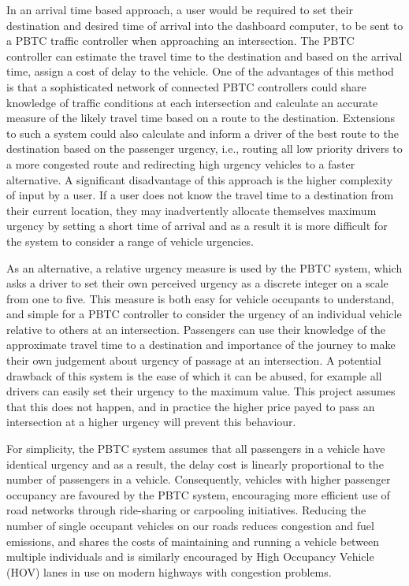 In an arrival time based approach, a user would be required to set their destination and desired time of arrival into the dashboard computer, to be sent to a PBTC traffic controller when approaching an intersection. The PBTC controller can estimate the travel time to the destination and based on the arrival time, assign a cost of delay to the vehicle. One of the advantages of this method is that a sophisticated network of connected PBTC controllers could share knowledge of traffic conditions at each intersection and calculate an accurate measure of the likely travel time based on a route to the destination. Extensions to such a system could also calculate and inform a driver of the best route to the destination based on the passenger urgency, i.e., routing all low priority drivers to a more congested route and redirecting high urgency vehicles to a faster alternative. A significant disadvantage of this approach is the higher complexity of input by a user. If a user does not know the travel time to a destination from their current location, they may inadvertently allocate themselves maximum urgency by setting a short time of arrival and as a result it is more difficult for the system to consider a range of vehicle urgencies.

As an alternative, a relative urgency measure is used by the PBTC system, which asks a driver to set their own perceived urgency as a discrete integer on a scale from one to five. This measure is both easy for vehicle occupants to understand, and simple for a PBTC controller to consider the urgency of an individual vehicle relative to others at an intersection. Passengers can use their knowledge of the approximate travel time to a destination and importance of the journey to make their own judgement about urgency of passage at an intersection. A potential drawback of this system is the ease of which it can be abused, for example all drivers can easily set their urgency to the maximum value. This project assumes that this does not happen, and in practice the higher price payed to pass an intersection at a higher urgency will prevent this behaviour. 

For simplicity, the PBTC system assumes that all passengers in a vehicle have identical urgency and as a result, the  delay cost is linearly proportional to the number of passengers in a  vehicle. Consequently, vehicles with higher passenger occupancy are favoured by the PBTC system, encouraging more efficient use of road networks through ride-sharing or carpooling initiatives. Reducing the number of single occupant vehicles on our roads reduces congestion and fuel emissions, and shares the costs of maintaining and running a vehicle between multiple individuals and is similarly encouraged by High Occupancy Vehicle (HOV) lanes in use on modern highways with congestion problems.

